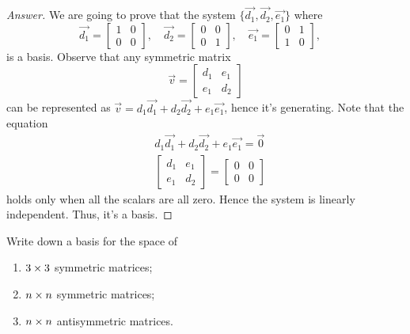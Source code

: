 \begin{proof}[Answer]
  We are going to prove that the system $\{\vec{d_1},\vec{d_2},\vec{e_1}\}$ where
  \[
    \vec{d_1}= \begin{bmatrix} 1&0\\0&0 \end{bmatrix},\quad
    \vec{d_2}= \begin{bmatrix} 0&0\\0&1 \end{bmatrix},\quad
    \vec{e_1}= \begin{bmatrix} 0&1\\1&0 \end{bmatrix},\quad
  \]
  is a basis. Observe that any symmetric matrix 
  \[
    \vec{v}=
    \begin{bmatrix}
      d_1 & e_1\\
      e_1 & d_2
    \end{bmatrix}
  \]
  can be represented as $\vec{v}=d_1\vec{d_1}+d_2\vec{d_2}+e_1\vec{e_1}$,
  hence it's generating. Note that the equation 
  \begin{align*}
    &d_1\vec{d_1}+d_2\vec{d_2}+e_1\vec{e_1}=\vec{0}\\
    &\begin{bmatrix}d_1 & e_1\\  e_1 &d_2\end{bmatrix}=\begin{bmatrix}0&0\\0&0\end{bmatrix}
  \end{align*}
  holds only when all the scalars are all zero. Hence the system is linearly 
  independent. Thus, it's a basis.

\end{proof}
\begin{exercise}
  Write down a basis for the space of
  \begin{enumerate}
    \item $3\times 3$ symmetric matrices;
    \item $n\times n$ symmetric matrices;
    \item $n\times n$ antisymmetric matrices.
  \end{enumerate}
\end{exercise}
